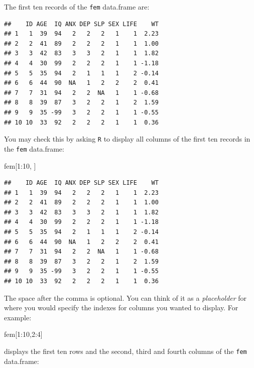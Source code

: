 \documentclass[
  12pt,
]{book}
\newenvironment{Shaded}{\begin{snugshade}}{\end{snugshade}}
\newcommand{\DecValTok}[1]{\textcolor[rgb]{0.00,0.00,0.81}{#1}}
\newcommand{\NormalTok}[1]{#1}
\newcommand{\SpecialCharTok}[1]{\textcolor[rgb]{0.00,0.00,0.00}{#1}}
\begin{document}
\newpage

The first ten records of the \texttt{fem} data.frame are:

\begin{verbatim}
##    ID AGE  IQ ANX DEP SLP SEX LIFE    WT
## 1   1  39  94   2   2   2   1    1  2.23
## 2   2  41  89   2   2   2   1    1  1.00
## 3   3  42  83   3   3   2   1    1  1.82
## 4   4  30  99   2   2   2   1    1 -1.18
## 5   5  35  94   2   1   1   1    2 -0.14
## 6   6  44  90  NA   1   2   2    2  0.41
## 7   7  31  94   2   2  NA   1    1 -0.68
## 8   8  39  87   3   2   2   1    2  1.59
## 9   9  35 -99   3   2   2   1    1 -0.55
## 10 10  33  92   2   2   2   1    1  0.36
\end{verbatim}

You may check this by asking \texttt{R} to display all columns of the first ten records in the \texttt{fem} data.frame:

\begin{Shaded}
\begin{Highlighting}[]
\NormalTok{fem[}\DecValTok{1}\SpecialCharTok{:}\DecValTok{10}\NormalTok{, ]}
\end{Highlighting}
\end{Shaded}

\begin{verbatim}
##    ID AGE  IQ ANX DEP SLP SEX LIFE    WT
## 1   1  39  94   2   2   2   1    1  2.23
## 2   2  41  89   2   2   2   1    1  1.00
## 3   3  42  83   3   3   2   1    1  1.82
## 4   4  30  99   2   2   2   1    1 -1.18
## 5   5  35  94   2   1   1   1    2 -0.14
## 6   6  44  90  NA   1   2   2    2  0.41
## 7   7  31  94   2   2  NA   1    1 -0.68
## 8   8  39  87   3   2   2   1    2  1.59
## 9   9  35 -99   3   2   2   1    1 -0.55
## 10 10  33  92   2   2   2   1    1  0.36
\end{verbatim}

\newpage

The space after the comma is optional. You can think of it as a \emph{placeholder} for where you would specify the indexes for columns you wanted to display. For example:

\begin{Shaded}
\begin{Highlighting}[]
\NormalTok{fem[}\DecValTok{1}\SpecialCharTok{:}\DecValTok{10}\NormalTok{,}\DecValTok{2}\SpecialCharTok{:}\DecValTok{4}\NormalTok{]}
\end{Highlighting}
\end{Shaded}

displays the first ten rows and the second, third and fourth columns of the \texttt{fem} data.frame:
\end{document}
